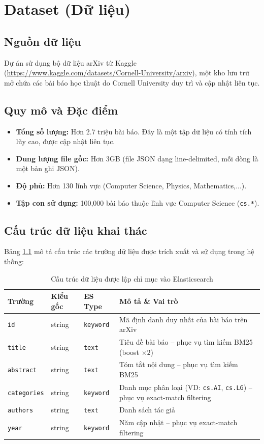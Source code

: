 \chapter{Dataset (Dữ liệu)}

\section{Nguồn dữ liệu}
Dự án sử dụng bộ dữ liệu arXiv từ Kaggle \cite{arxiv_dataset} (\url{https://www.kaggle.com/datasets/Cornell-University/arxiv}), một kho lưu trữ mở chứa các bài báo học thuật do Cornell University duy trì và cập nhật liên tục.

\section{Quy mô và Đặc điểm}
\begin{itemize}
    \item \textbf{Tổng số lượng:} Hơn 2.7 triệu bài báo. Đây là một tập dữ liệu có tính tích lũy cao, được cập nhật liên tục.
    \item \textbf{Dung lượng file gốc:} Hơn 3GB (file JSON dạng line-delimited, mỗi dòng là một bản ghi JSON).
    \item \textbf{Độ phủ:} Hơn 130 lĩnh vực (Computer Science, Physics, Mathematics,...).
    \item \textbf{Tập con sử dụng:} 100,000 bài báo thuộc lĩnh vực Computer Science (\texttt{cs.*}).
\end{itemize}

\section{Cấu trúc dữ liệu khai thác}
Bảng \ref{tab:data-schema} mô tả cấu trúc các trường dữ liệu được trích xuất và sử dụng trong hệ thống:

\begin{table}[H]
\centering
\begin{tabular}{|l|l|l|p{6cm}|}
\hline
\textbf{Trường} & \textbf{Kiểu gốc} & \textbf{ES Type} & \textbf{Mô tả \& Vai trò} \\ \hline
\texttt{id} & string & \texttt{keyword} & Mã định danh duy nhất của bài báo trên arXiv \\ \hline
\texttt{title} & string & \texttt{text} & Tiêu đề bài báo -- phục vụ tìm kiếm BM25 (boost $\times 2$) \\ \hline
\texttt{abstract} & string & \texttt{text} & Tóm tắt nội dung -- phục vụ tìm kiếm BM25 \\ \hline
\texttt{categories} & string & \texttt{keyword} & Danh mục phân loại (VD: \texttt{cs.AI}, \texttt{cs.LG}) -- phục vụ exact-match filtering \\ \hline
\texttt{authors} & string & \texttt{text} & Danh sách tác giả \\ \hline
\texttt{year} & string & \texttt{keyword} & Năm cập nhật -- phục vụ exact-match filtering \\ \hline
\end{tabular}
\caption{Cấu trúc dữ liệu được lập chỉ mục vào Elasticsearch}
\label{tab:data-schema}
\end{table}

